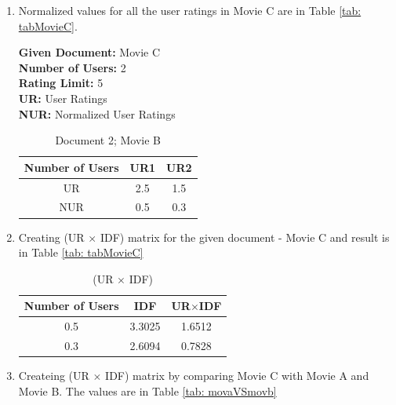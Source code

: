 \documentclass[12pt, titlepage, onecolumn]{article}
\begin{document}
{\begin{enumerate}
\begin{table}[ht]
\begin{center}
\begin{tabular}{|c|c|c|}
			
    		\hline
		\end{tabular}
		\caption{IDF Values}
		\end{center}
		\label{tab:movieB}
		\end{table}
	
	\item Normalized values for all the user ratings in Movie C are in Table \ref{tab: tabMovieC}.
	
	{\bf Given Document: } Movie C\\
		{\bf Number of Users: }2\\
		{\bf Rating Limit: }5\\
		{\bf UR: }User Ratings\\
		{\bf NUR: }Normalized User Ratings	
		\begin{table}[ht]
		\label{tab: tabMovieC}
		\begin{center}
		\begin{tabular}{ccc}
    		\hline
       			Number of Users	&	UR1	&	UR2	\\
		\hline
    			UR				&	2.5	&	1.5	\\
			NUR				&	0.5	&	0.3	\\
    		\hline
		\end{tabular}
		\caption{Document 2; Movie B}
		\end{center}
		\label{tab:movieB}
		\end{table}

	\item Creating (UR $\times$ IDF) matrix for the given document - Movie C and result is in Table \ref{tab: tabMovieC}
	
	\begin{table}[ht]
		\label{tab: tabMovieC}
		\begin{center}
		\begin{tabular}{ccc}
    		\hline
       			Number of Users	&	IDF	&	UR$\times$IDF	\\
		\hline
    			0.5				&	3.3025	&	1.6512	\\
			0.3				&	2.6094	&	0.7828	\\
    		\hline
		\end{tabular}
		\caption{(UR $\times$ IDF)}
		\end{center}
		\label{tab:URIDF}
		\end{table}
		
		
	\item Createing (UR $\times$ IDF) matrix by comparing Movie C with Movie A and Movie B. The values are in Table \ref{tab: movaVSmovb}
	

\end{enumerate}}
\end{document}
